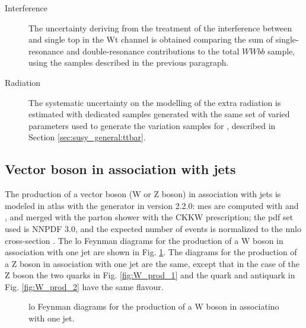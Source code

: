 \begin{description}
\item[Interference] The uncertainty deriving from the treatment of the interference between \ttbar and single top in the Wt channel is obtained comparing the sum of single-resonance and double-resonance contributions to the total $WWbb$ sample, using the samples described in the previous paragraph.

\item[Radiation] The systematic uncertainty on the modelling of the extra radiation is estimated with dedicated samples generated with the same set of varied parameters used to generate the variation samples for \ttbar, described in Section \ref{sec:susy_general:ttbar}. 

\end{description}

\subsection{Vector boson in association with jets}

The production of a vector boson (W or Z boson) in association with jets is modeled in \gls{atlas} with the \Sherpa generator in version 2.2.0: \glspl{me} are 
computed with \comix \cite{Gleisberg:2008fv} and \OL \cite{Cascioli:2011va}, and merged with the \Sherpa parton shower with the CKKW prescription; the \gls{pdf} set used is NNPDF 3.0, and the expected number of events is normalized to the \gls{nnlo} cross-section \cite{Catani:2009sm}.
The \gls{lo} Feynman diagrams for the production of a W boson in association with one jet are shown in Fig. \ref{fig:W_prod}. 
The diagrams for the production of a Z boson in association with one jet are the same, except that in the case of the Z boson the 
two quarks in Fig. \ref{fig:W_prod_1} and the quark and antiquark in Fig. \ref{fig:W_prod_2} have the same flavour. 

\begin{figure}[h]
\centering 
{}
\caption{\gls{lo} Feynman diagrams for the production of a W boson in associatino with one jet.}\label{fig:W_prod}
\end{figure}

